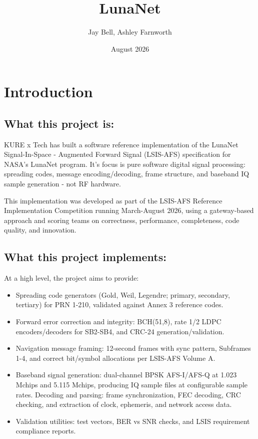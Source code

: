 \documentclass{article}
\title{LunaNet}
\author{Jay Bell, Ashley Farnworth}
\date{August 2026}
\begin{document}
\maketitle

\section{Introduction}

\subsection*{What this project is:}

KURE x Tech has built a software reference implementation of the LunaNet Signal-In-Space - Augmented Forward Signal (LSIS-AFS) specification for NASA's LunaNet program. It's focus is pure software digital signal processing: spreading codes, message encoding/decoding, frame structure, and baseband IQ sample generation - not RF hardware.

This implementation was developed as part of the LSIS-AFS Reference Implementation Competition running March-August 2026, using a gateway-based approach and scoring teams on correctness, performance, completeness, code quality, and innovation.

\subsection*{What this project implements:}

At a high level, the project aims to provide:
\begin{itemize}
    \item Spreading code generators (Gold, Weil, Legendre; primary, secondary, tertiary) for PRN 1-210, validated against Annex 3 reference codes.
    \item Forward error correction and integrity: BCH(51,8), rate 1/2 LDPC encoders/decoders for SB2-SB4, and CRC-24 generation/validation.
    \item Navigation message framing: 12-second frames with sync pattern, Subframes 1-4, and correct bit/symbol allocations per LSIS-AFS Volume A.
    \item Baseband signal generation: dual-channel BPSK AFS-I/AFS-Q at 1.023 Mchips and 5.115 Mchips, producing IQ sample files at configurable sample rates.
 Decoding and parsing: frame synchronization, FEC decoding, CRC checking, and extraction of clock, ephemeris, and network access data.
    \item Validation utilities: test vectors, BER vs SNR checks, and LSIS requirement compliance reports.
\end{itemize}
\end{document}
